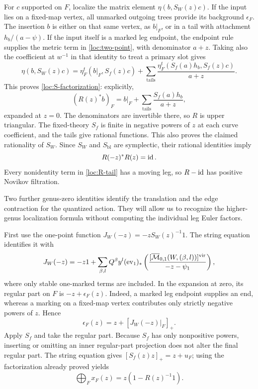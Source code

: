 For $c$ supported on $F$, localize the matrix element
$\eta(b,S_W(z)c)$. If the input lies on a fixed-map vertex, all
unmarked outgoing trees provide its background $\epsilon_F$.
The insertion $b$ is either on that same vertex, as $b|_F$, or in a
tail with attachment $h_b/(a-\psi)$. If the input itself is a marked
leg endpoint, the endpoint rule supplies the metric term in
\eqref{loc:two-point}, with denominator $a+z$.
Taking also the coefficient at $w^{-1}$ in that identity to treat a
primary slot gives
\begin{equation}\label{loc:S-tail}
 \eta(b,S_W(z)c)=\eta_F^t(b|_F,S_f(z)c)
       +\sum_{\mathrm{tails}}
          \frac{\eta_F^t(S_f(a)h_b,S_f(z)c)}{a+z}.
\end{equation}
This proves \eqref{loc:S-factorization}: explicitly,
\begin{equation}\label{loc:R-tail}
       (R(z)^*b)_F=b|_F+
              \sum_{\mathrm{tails}}\frac{S_f(a)h_b}{a+z},
\end{equation}
expanded at $z=0$. The denominators are invertible there, so $R$ is
upper triangular. The fixed-theory $S_f$ is finite in negative powers
of $z$ at each curve coefficient, and the tails give rational functions.
This also proves the claimed rationality of $S_W$. Since $S_W$ and
$S_{\mathrm{bl}}$ are symplectic, their rational identities imply
\begin{equation}\label{loc:R-symplectic}
                         R(-z)^*R(z)=\operatorname{id}.
\end{equation}
Every nonidentity term in \eqref{loc:R-tail} has a moving leg, so
$R-\operatorname{id}$ has positive Novikov filtration.

Two further genus-zero identities identify the translation and the
edge contraction for the quantized action. They will allow us to
recognize the higher-genus localization formula without computing
the individual leg Euler factors.

First use the one-point function $J_W(-z)=-zS_W(z)^{-1}1$.
The string equation identifies it with
\[
 J_W(-z)=-z1+
 \sum_{\beta,l}Q^\beta y^l(\operatorname{ev}_1)_*
 \left(\frac{[\overline{\mathcal M}_{0,1}(W,(\beta,l))]^{\mathrm{vir}}}
                  {-z-\psi_1}\right),
\]
where only stable one-marked terms are included. In the expansion at
zero, its regular part on $F$ is $-z+\epsilon_F(z)$.
Indeed, a marked leg endpoint supplies
an end, whereas a marking on a fixed-map vertex contributes only
strictly negative powers of $z$. Hence
\[
 \epsilon_F(z)=z+
                [J_W(-z)|_F]_+.
\]
Apply $S_f$ and take the regular part. Because $S_f$ has only
nonpositive powers, inserting or omitting an inner regular-part
projection does not alter the final regular part. The string equation
gives $[S_f(z)z]_+=z+u_F$; using the factorization already proved yields
\begin{equation}\label{loc:translation}
                     \bigoplus_Fx_F(z)=z(1-R(z)^{-1}1).
\end{equation}

